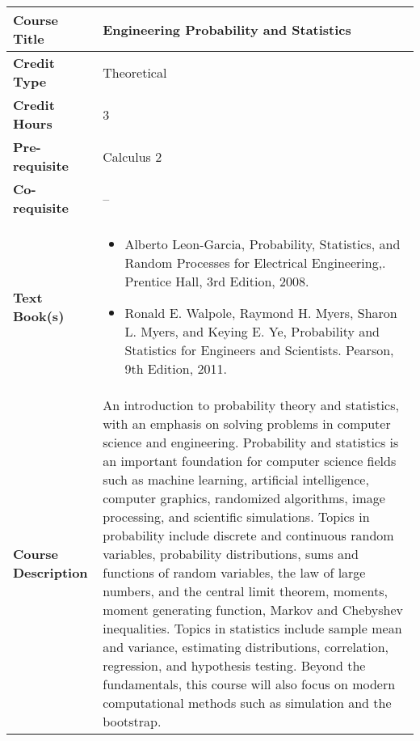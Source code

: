 \documentclass[11pt]{article}
\begin{document}
\begin{table}[h!]
\begin{tabular}{|l|l|}
\hline
\textbf{Course Title}       &  Engineering Probability and Statistics \\ \hline
\textbf{Credit Type}        &  Theoretical \\ \hline
\textbf{Credit Hours}       & 3 \\ \hline
\textbf{Pre-requisite}       &  Calculus 2 \\ \hline
\textbf{Co-requisite}       &  -- \\ \hline
\textbf{Text Book(s)}       & \begin{minipage}{.70\textwidth}
\begin{itemize} \itemsep-0.4em
	\vspace{3mm}
	\item Alberto Leon-Garcia, Probability, Statistics, and Random Processes for Electrical Engineering,. Prentice Hall, 3rd Edition, 2008.
	\item Ronald E. Walpole, Raymond H. Myers, Sharon L. Myers, and Keying E. Ye, Probability and Statistics for Engineers and Scientists. Pearson, 9th Edition, 2011.
	\vspace{3mm}
\end{itemize}
\end{minipage}\\ \hline
\textbf{Course Description} & \begin{minipage}{.70\textwidth}
\vspace{3mm}
An introduction to probability theory and statistics, with an emphasis on solving problems in computer science and engineering. Probability and statistics is an important foundation for computer science fields such as machine learning, artificial intelligence, computer graphics, randomized algorithms, image processing, and scientific simulations. Topics in probability include discrete and continuous random variables, probability distributions, sums and functions of random variables, the law of large numbers, and the central limit theorem, moments, moment generating function, Markov and Chebyshev inequalities. Topics in statistics include sample mean and variance, estimating distributions, correlation, regression, and hypothesis testing. Beyond the fundamentals, this course will also focus on modern computational methods such as simulation and the bootstrap.
\vspace{3mm}
\end{minipage} \\ \hline
\end{tabular}
\end{table}
\end{document}
